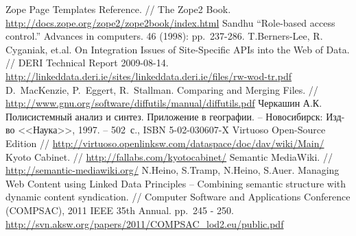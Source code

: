 \documentclass[utf8]{../IncArticle}
\begin{document}
\begin{thebibliography}{11}
 Zope Page Templates Reference. // The Zope2 Book. \url{http://docs.zope.org/zope2/zope2book/index.html}
 Sandhu ``Role-based access control.'' Advances in
  computers. 46 (1998): pp.~237-286.
 T.Berners-Lee, R. Cyganiak, et.al. On Integration
  Issues of Site-Specific APIs into the Web of Data. // DERI Technical
  Report
  2009-08-14. \url{http://linkeddata.deri.ie/sites/linkeddata.deri.ie/files/rw-wod-tr.pdf}
 D.~MacKenzie, P.~Eggert, R.~Stallman. Comparing and
  Merging Files. //
  \url{http://www.gnu.org/software/diffutils/manual/diffutils.pdf}
 Черкашин А.К. Полисистемный анализ и
  синтез. Приложение в географии. -- Новосибирск: Изд-во <<Наука>>,
  1997. -- 502~с., ISBN 5-02-030607-X
 Virtuoso Open-Source Edition //
  \url{http://virtuoso.openlinksw.com/dataspace/doc/dav/wiki/Main/}
 Kyoto Cabinet. // \url{http://fallabs.com/kyotocabinet/}
 Semantic MediaWiki. // \url{http://semantic-mediawiki.org/}
 N.Heino, S.Tramp, N.Heino, S.Auer. Managing Web
  Content using Linked Data Principles – Combining semantic structure
  with dynamic content syndication. // Computer Software and Applications
  Conference (COMPSAC), 2011 IEEE 35th Annual. pp.~245 -
  250. \url{http://svn.aksw.org/papers/2011/COMPSAC_lod2.eu/public.pdf}

\end{thebibliography}

\end{document}
